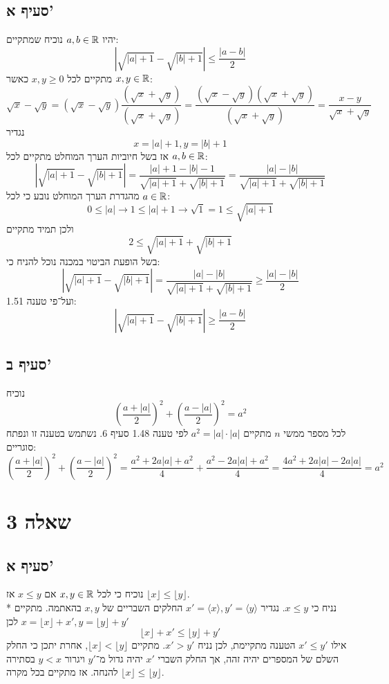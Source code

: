 \subsection{סעיף א'}
יהיו $a, b \in \mathbb{R}$ נוכיח שמתקיים:
\[
	\left| \sqrt{\left| a \right| + 1} - \sqrt{\left| b \right| + 1} \right| \le \frac{|a - b|}{2}
\]
מתקיים לכל $x, y \ge 0$ כאשר $x, y \in \mathbb{R}$:
\[
	\sqrt{x} - \sqrt{y}
	= (\sqrt{x} - \sqrt{y}) \frac{(\sqrt{x} + \sqrt{y})}{(\sqrt{x} + \sqrt{y})}
	= \frac{(\sqrt{x} - \sqrt{y}) (\sqrt{x} + \sqrt{y})}{(\sqrt{x} + \sqrt{y})}
	= \frac{x - y}{\sqrt{x} + \sqrt{y}}
\]
נגדיר
\[
	x = |a| + 1, y = |b| + 1
\]
אז בשל חיוביות הערך המוחלט מתקיים לכל $a, b \in \mathbb{R}$:
\[
	\left| \sqrt{\left| a \right| + 1} - \sqrt{\left| b \right| + 1} \right|
	= \frac{|a| + 1 - |b| - 1}{\sqrt{\left| a \right| + 1} + \sqrt{\left| b \right| + 1}}
	= \frac{|a| - |b|}{\sqrt{\left| a \right| + 1} + \sqrt{\left| b \right| + 1}}
\]
מהגדרת הערך המוחלט נובע כי לכל $a \in \mathbb{R}$:
\[
	0 \le |a| \rightarrow 1 \le |a| + 1 \rightarrow \sqrt{1} = 1 \le \sqrt{|a| + 1}
\]
ולכן תמיד מתקיים
\[
	2 \le \sqrt{\left| a \right| + 1} + \sqrt{\left| b \right| + 1}
\]
בשל הופעת הביטוי במכנה נוכל להניח כי:
\[
	\left| \sqrt{\left| a \right| + 1} - \sqrt{\left| b \right| + 1} \right| = 
	\frac{|a| - |b|}{\sqrt{\left| a \right| + 1} + \sqrt{\left| b \right| + 1}}
	\ge \frac{|a| - |b|}{2}
\]
ועל־פי טענה 1.51:
\[
	\left| \sqrt{\left| a \right| + 1} - \sqrt{\left| b \right| + 1} \right|
	\ge \frac{|a - b|}{2}
\]

\subsection{סעיף ב'}
נוכיח
\[
	{\left( \frac{a + |a|}{2} \right)}^2
	+ {\left( \frac{a - |a|}{2} \right)}^2
	= a^2
\]
לכל מספר ממשי $n$ מתקיים $a^2 = |a| \cdot |a|$
לפי טענה 1.48 סעיף 6. נשתמש בטענה זו ונפתח סוגריים:
\[
	{\left( \frac{a + |a|}{2} \right)}^2
	+ {\left( \frac{a - |a|}{2} \right)}^2
	=
	\frac{a^2 + 2 a |a| + a^2}{4}
	+ \frac{a^2 - 2 a |a| + a^2}{4}
	=
	\frac{4 a^2 + 2 a |a| - 2 a |a|}{4}
	= a^2
\]

\section{שאלה 3}
\subsection{סעיף א'}
נוכיח כי לכל $x, y \in \mathbb{R}$ אם $x \le y$ אז $\lfloor x \rfloor \le \lfloor y \rfloor$. \\*
נניח כי $x \le y$. נגדיר $x' = \langle x \rangle, y' = \langle y \rangle$ החלקים השבריים של $x, y$ בהאתמה.
מתקיים $x = \lfloor x \rfloor + x', y = \lfloor y \rfloor + y'$ לכן
\[
	\lfloor x \rfloor + x' \le \lfloor y \rfloor + y'
\]
אילו $x' \le y'$ הטענה מתקיימת, לכן נניח $x' > y'$.
מתקיים $\lfloor x \rfloor < \lfloor y \rfloor$, אחרת יתכן כי החלק השלם של המספרים יהיה זהה, אך החלק השברי $x'$ יהיה גדול מ־$y'$ ויגרור $y < x$ בסתירה להנחה.
אז מתקיים בכל מקרה $\lfloor x \rfloor \le \lfloor y \rfloor$.

